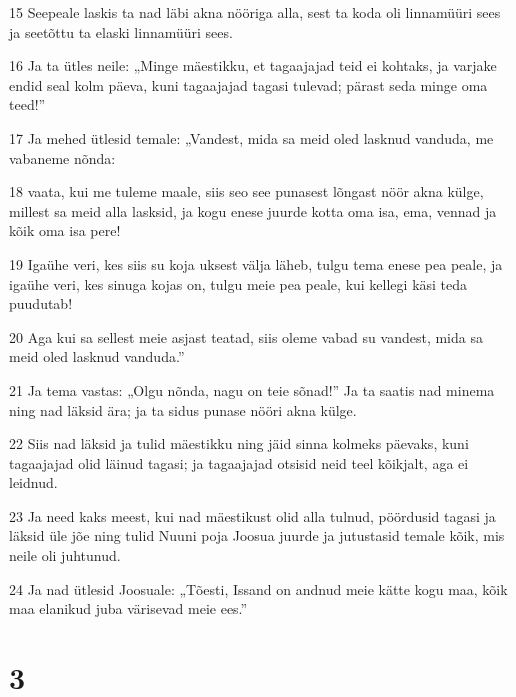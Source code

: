 \par 15 Seepeale laskis ta nad läbi akna nööriga alla, sest ta koda oli linnamüüri sees ja seetõttu ta elaski linnamüüri sees.
\par 16 Ja ta ütles neile: „Minge mäestikku, et tagaajajad teid ei kohtaks, ja varjake endid seal kolm päeva, kuni tagaajajad tagasi tulevad; pärast seda minge oma teed!”
\par 17 Ja mehed ütlesid temale: „Vandest, mida sa meid oled lasknud vanduda, me vabaneme nõnda:
\par 18 vaata, kui me tuleme maale, siis seo see punasest lõngast nöör akna külge, millest sa meid alla lasksid, ja kogu enese juurde kotta oma isa, ema, vennad ja kõik oma isa pere!
\par 19 Igaühe veri, kes siis su koja uksest välja läheb, tulgu tema enese pea peale, ja igaühe veri, kes sinuga kojas on, tulgu meie pea peale, kui kellegi käsi teda puudutab!
\par 20 Aga kui sa sellest meie asjast teatad, siis oleme vabad su vandest, mida sa meid oled lasknud vanduda.”
\par 21 Ja tema vastas: „Olgu nõnda, nagu on teie sõnad!” Ja ta saatis nad minema ning nad läksid ära; ja ta sidus punase nööri akna külge.
\par 22 Siis nad läksid ja tulid mäestikku ning jäid sinna kolmeks päevaks, kuni tagaajajad olid läinud tagasi; ja tagaajajad otsisid neid teel kõikjalt, aga ei leidnud.
\par 23 Ja need kaks meest, kui nad mäestikust olid alla tulnud, pöördusid tagasi ja läksid üle jõe ning tulid Nuuni poja Joosua juurde ja jutustasid temale kõik, mis neile oli juhtunud.
\par 24 Ja nad ütlesid Joosuale: „Tõesti, Issand on andnud meie kätte kogu maa, kõik maa elanikud juba värisevad meie ees.”

\chapter{3}

